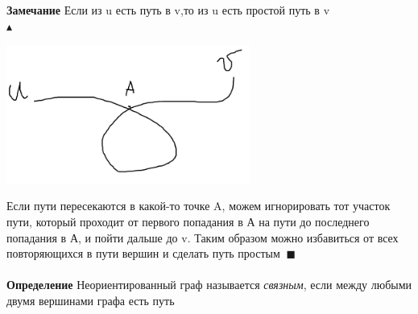 \\
\\
\textbf{Замечание} Если из u есть путь в v,то из u есть простой путь в v
\\
$\blacktriangle $
\begin{center}
    \includegraphics[width=8cm]{images/25-28_algo6.PNG}
\end{center}
Если пути пересекаются в какой-то точке A, можем игнорировать тот участок пути, который проходит от первого попадания в А на пути до последнего попадания в А, и пойти дальше до v. Таким образом можно избавиться от всех повторяющихся в пути вершин и сделать путь простым $\ \blacksquare$
\\
\\
\textbf{Определение} Неориентированный граф называется \textit{связным}, если между любыми двумя вершинами графа есть путь
\setcounter{section}{25}
